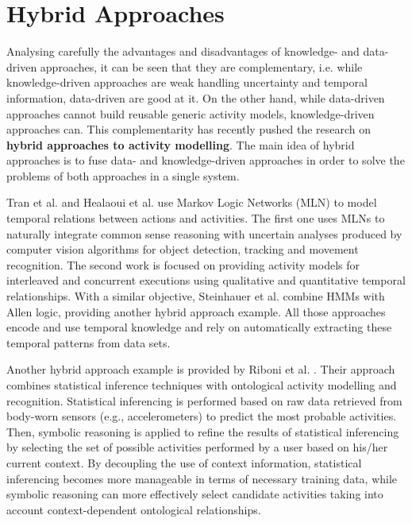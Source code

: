\section{Hybrid Approaches}
\label{sec:soa:hybrid}


Analysing carefully the advantages and disadvantages of knowledge- and data-driven approaches, it can be seen that they are complementary, i.e. while knowledge-driven approaches are weak handling uncertainty and temporal information, data-driven are good at it. On the other hand, while data-driven approaches cannot build reusable generic activity models, knowledge-driven approaches can. This complementarity has recently pushed the research on \textbf{hybrid approaches to activity modelling}. The main idea of hybrid approaches is to fuse data- and knowledge-driven approaches in order to solve the problems of both approaches in a single system.

Tran et al. \cite{Tran2008} and Healaoui et al. \cite{Helaoui2011a} use Markov Logic Networks (MLN) to model temporal relations between actions and activities. The first one uses MLNs to naturally integrate common sense reasoning with uncertain analyses produced by computer vision algorithms for object detection, tracking and movement recognition. The second work is focused on providing activity models for interleaved and concurrent executions using qualitative and quantitative temporal relationships. With a similar objective, Steinhauer et al. \cite{Steinhauer2010} combine HMMs with Allen logic, providing another hybrid approach example. All those approaches encode and use temporal knowledge and rely on automatically extracting these temporal patterns from data sets.

Another hybrid approach example is provided by Riboni et al. \cite{Riboni2011a}. Their approach combines statistical inference techniques with ontological activity modelling and recognition. Statistical inferencing is performed based on raw data retrieved from body-worn sensors (e.g., accelerometers) to predict the most probable activities. Then, symbolic reasoning is applied to refine the results of statistical inferencing by selecting the set of possible activities performed by a user based on his/her current context. By decoupling the use of context information, statistical inferencing becomes more manageable in terms of necessary training data, while symbolic reasoning can more effectively select candidate activities taking into account context-dependent ontological relationships.

